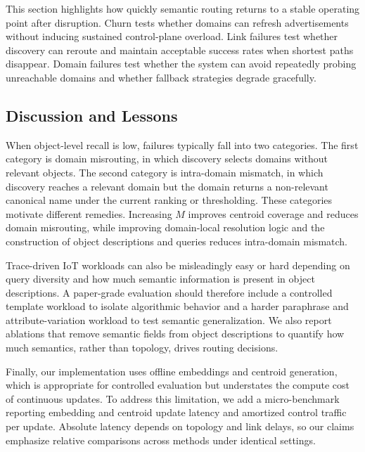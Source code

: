 \documentclass[journal]{IEEEtran}
\begin{document}
This section highlights how quickly semantic routing returns to a stable operating point after disruption.
Churn tests whether domains can refresh advertisements without inducing sustained control-plane overload.
Link failures test whether discovery can reroute and maintain acceptable success rates when shortest paths disappear.
Domain failures test whether the system can avoid repeatedly probing unreachable domains and whether fallback strategies degrade gracefully.

\subsection{Discussion and Lessons}
\label{sec:eval_discussion}

When object-level recall is low, failures typically fall into two categories.
The first category is domain misrouting, in which discovery selects domains without relevant objects.
The second category is intra-domain mismatch, in which discovery reaches a relevant domain but the domain returns a non-relevant canonical name under the current ranking or thresholding.
These categories motivate different remedies.
Increasing $M$ improves centroid coverage and reduces domain misrouting, while improving domain-local resolution logic and the construction of object descriptions and queries reduces intra-domain mismatch.

Trace-driven IoT workloads can also be misleadingly easy or hard depending on query diversity and how much semantic information is present in object descriptions.
A paper-grade evaluation should therefore include a controlled template workload to isolate algorithmic behavior and a harder paraphrase and attribute-variation workload to test semantic generalization.
We also report ablations that remove semantic fields from object descriptions to quantify how much semantics, rather than topology, drives routing decisions.

Finally, our implementation uses offline embeddings and centroid generation, which is appropriate for controlled evaluation but understates the compute cost of continuous updates.
To address this limitation, we add a micro-benchmark reporting embedding and centroid update latency and amortized control traffic per update.
Absolute latency depends on topology and link delays, so our claims emphasize relative comparisons across methods under identical settings.
\end{document}
